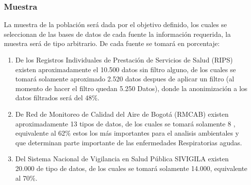 \documentclass[a4paper,openright,12pt]{book}
\theoremstyle{definition}
\theoremstyle{remark}
\begin{document}
        \subsubsection{Muestra}
        La muestra de la población será dada por el objetivo definido, los cuales se seleccionan de las bases de datos de cada fuente la información requerida, la muestra será de tipo arbitrario. De cada fuente se tomará en porcentaje:
        \begin{enumerate}
			\item De los Registros Individuales de Prestación de Servicios de Salud (RIPS) existen aproximadamente el 10.500 datos sin filtro alguno, de los cuales se tomará solamente aproximado 2.520 datos despues de aplicar un filtro (al momento de hacer el filtro quedan 5.250 Datos),  donde la anonimización a los datos filtrados será del 48\%.
            \item De Red de Monitoreo de Calidad del Aire de Bogotá (RMCAB) existen aproximadamente 13 tipos de datos, de los cuales se tomará solamente 8 , equivalente al 62\% estos los más importantes para el analisis ambientales y que determinan parte importante de las enfermedades Respiratorias agudas.
            \item Del Sistema Nacional de Vigilancia en Salud Pública SIVIGILA existen 20.000 de tipo de datos, de los cuales se tomará solamente 14.000, equivalente al 70\%.
		\end{enumerate}
        
\end{document}
